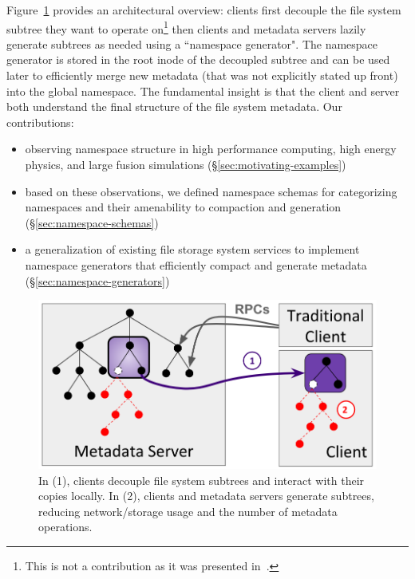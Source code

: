 Figure~\ref{fig:intro} provides an architectural overview: clients first
decouple the file system subtree they want to operate on\footnote{This is not a
contribution as it was presented in~\cite{sevilla:ipdps18-cudele}.} then
clients and metadata servers lazily generate subtrees as needed using a
``namespace generator". The namespace generator is stored in the root inode of
the decoupled subtree and can be used later to efficiently merge new metadata
(that was not explicitly stated up front) into the global namespace.  The
fundamental insight is that the client and server both understand the final
structure of the file system metadata. Our contributions:
\vspace{-0.5em}
\begin{itemize}
  \setlength\itemsep{-0.5em}

\item observing namespace structure in high performance computing, high energy
physics, and large fusion simulations (\S\ref{sec:motivating-examples})

\item based on these observations, we defined namespace schemas for
categorizing namespaces and their amenability to compaction and generation
(\S\ref{sec:namespace-schemas})

\item a generalization of existing file storage system services to implement
namespace generators that efficiently compact and generate metadata
(\S\ref{sec:namespace-generators})
\end{itemize}

\begin{figure}[t]
  \centering
  \includegraphics[width=0.8\linewidth]{figures/intro.png}
  \caption{In (1), clients decouple file system subtrees and interact with
their copies locally. In (2), clients and metadata servers generate subtrees,
reducing network/storage usage and the number of metadata operations.
\label{fig:intro}}
\end{figure}
